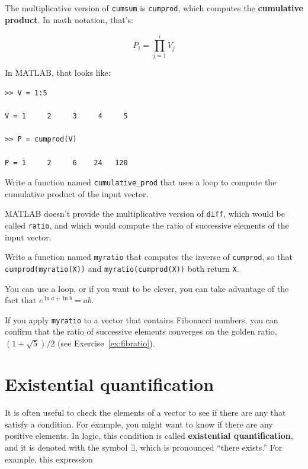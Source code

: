 \documentclass[
]{book}
\begin{document}
The multiplicative version of {\tt cumsum} is {\tt cumprod},
which computes the {\bf cumulative product}.  In math notation,
that's:

\begin{equation}
P_i = \prod_{j=1}^i V_j
\end{equation}

In MATLAB, that looks like:

\begin{verbatim}
>> V = 1:5

V = 1     2     3     4     5

>> P = cumprod(V)

P = 1     2     6    24   120
\end{verbatim}

\begin{ex}
Write a function named {\tt cumulative\_prod} that uses
a loop to compute the cumulative product of the input vector.
\end{ex}

MATLAB doesn't provide the multiplicative version
of {\tt diff}, which would be called {\tt ratio}, and which would
compute the ratio of successive elements of the input vector.

\begin{ex}
Write a function named {\tt myratio} that computes the
inverse of {\tt cumprod}, so that {\tt cumprod(myratio(X))} and
{\tt myratio(cumprod(X))} both
return {\tt X}.

You can use a loop, or if you want to be clever, you can take
advantage of the fact that $e^{\ln a + \ln b} = a b$.

If you apply {\tt myratio} to a vector that contains Fibonacci
numbers, you can confirm that the ratio of successive elements
converges on the golden ratio, $(1+\sqrt{5})/2$ (see
Exercise~\ref{ex:fibratio}).
\end{ex}



\section{Existential quantification}

It is often useful to check the elements of a vector to see if there
are any that satisfy a condition.  For example, you might want to
know if there are any positive elements.  In logic, this condition
is called {\bf existential quantification}, and it is denoted with
the symbol $\exists$, which is pronounced ``there exists.''  For example,
this expression
\end{document}
